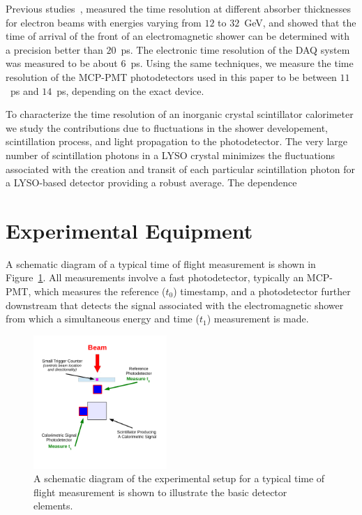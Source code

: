 \documentclass[12pt]{article}
\begin{document}
{Previous studies~\cite{MCPFastCaloNIMA}, measured the time resolution at different
absorber thicknesses for electron beams with energies varying from $12$ to
$32$~GeV, and showed that the time of arrival of the front of an electromagnetic
shower can be determined with a precision better than $20$~ps. The electronic
time resolution of the DAQ system was measured to be about $6$~ps. Using
the same techniques, we measure the time resolution of the MCP-PMT photodetectors used in this paper
 to be between $11$~ps and $14$~ps, depending on the exact device.

To characterize the time resolution of an inorganic crystal scintillator  calorimeter  we
study the contributions due to fluctuations in the shower developement, scintillation process, and light propagation 
to the photodetector. 
The very large number of scintillation photons in a LYSO crystal minimizes
the fluctuations associated with the creation and transit of each particular
scintillation photon for a LYSO-based detector providing a robust average. 
The dependence 
 


\section{Experimental Equipment}

A schematic diagram of a typical time of flight measurement
is shown in Figure~\ref{fig:TypicalSchematicDiagram}. All
measurements involve a fast photodetector,  typically 
an MCP-PMT, which 
measures the reference ($t_{0}$) timestamp, and a photodetector further downstream
that detects the signal associated with the
electromagnetic shower from which a simultaneous energy 
and time ($t_{1}$) measurement is made. 

\begin{figure}[H] \centering
\includegraphics[width=0.45\textwidth]{figs/TypicalSchematicDiagram} 
\caption{A schematic diagram of the experimental setup for
a typical time of flight measurement is shown to illustrate the
basic detector elements.} 
\label{fig:TypicalSchematicDiagram}
\end{figure}

}
\end{document}
